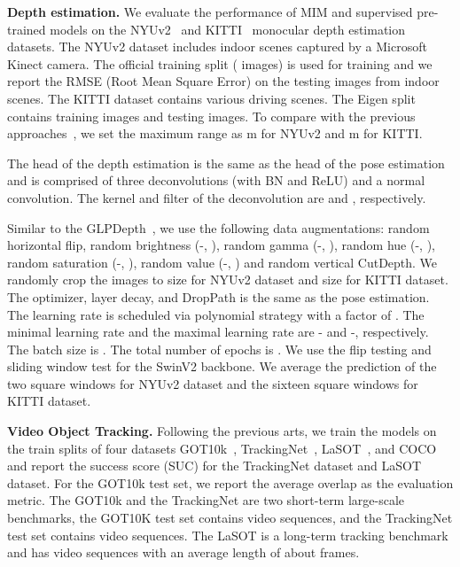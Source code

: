 \documentclass{article}
\begin{document}
	\noindent\textbf{Depth estimation.}
	We evaluate the performance of MIM and supervised pre-trained models on the NYUv2~\cite{nathan2012nyuv2} and KITTI~\cite{andreas2013kitti} monocular depth estimation datasets. 
	The NYUv2 dataset includes  indoor scenes captured by a Microsoft Kinect camera. The official training split ( images) is used for training and we report the RMSE (Root Mean Square Error) on the  testing images from  indoor scenes.
	The KITTI dataset contains various driving scenes. The Eigen split~\cite{eigen2014depth} contains  training images and  testing images.
	To compare with the previous approaches~\cite{ranftl2021dpt, kim2022glpdepth}, we set the maximum range as m for NYUv2 and m for KITTI.
	
	The head of the depth estimation is the same as the head of the pose estimation and is comprised of three deconvolutions (with BN and ReLU) and a normal convolution. The kernel and filter of the deconvolution are  and , respectively. 
	
     Similar to the GLPDepth~\cite{kim2022glpdepth}, we use the following data augmentations: random horizontal flip, random brightness (-, ), random gamma (-, ), random hue (-, ), random saturation (-, ), random value (-, ) and random vertical CutDepth. We randomly crop the images to  size for NYUv2 dataset and  size for KITTI dataset. The optimizer, layer decay, and DropPath is the same as the pose estimation. The learning rate is scheduled via polynomial strategy with a factor of . The minimal learning rate and the maximal learning rate are - and -, respectively. The batch size is . The total number of epochs is . We use the flip testing and sliding window test for the SwinV2 backbone. We average the prediction of the two square windows for NYUv2 dataset and the sixteen square windows for KITTI dataset. 
	 
	\noindent\textbf{Video Object Tracking.}
	Following the previous arts, we train the models on the train splits of four datasets GOT10k~\cite{huang2021got10k}, TrackingNet~\cite{muller2018tracknet}, LaSOT~\cite{fan2019lasot}, and COCO~\cite{lin2014microsoft} and report the success score (SUC) for the TrackingNet dataset and LaSOT dataset. For the GOT10k test set, we report the average overlap as the evaluation metric. The GOT10k and the TrackingNet are two short-term large-scale benchmarks, the GOT10K test set contains  video sequences, and the TrackingNet test set contains  video sequences. The LaSOT is a long-term tracking benchmark and has  video sequences with an average length of about  frames.
	
\end{document}

